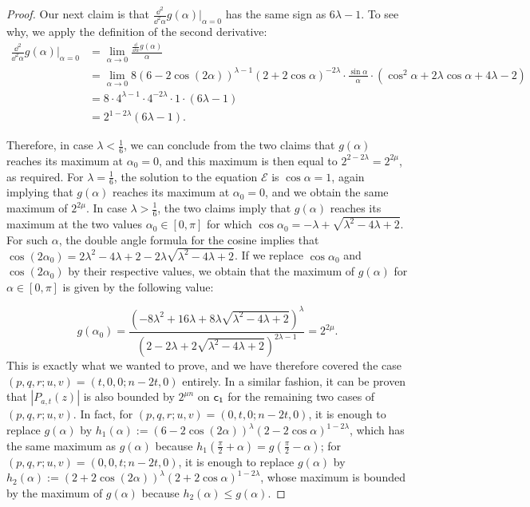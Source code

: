 \documentclass[11pt]{llncs}
\begin{document}
\begin{proof}
    Our next claim is that $\frac{\dd^2}{\dd^2\alpha}g(\alpha)\vert_{\alpha=0}$ has the same sign as $6\lambda -1$. To see why, we apply the definition of the second derivative:
    \begin{align*}
        \frac{\dd^2}{\dd^2\alpha}g(\alpha)\vert_{\alpha=0}
        &=\lim_{\alpha\to 0}\frac{\frac{\dd}{\dd\alpha}g(\alpha)}{\alpha}\\
        &=\lim_{\alpha\to 0}8(6-2\cos(2\alpha))^{\lambda-1}(2+2\cos\alpha)^{-2\lambda}\cdot\frac{\sin\alpha}{\alpha}\cdot\left(\cos^2\alpha+2\lambda\cos\alpha+4\lambda-2\right)\\
        &=8\cdot4^{\lambda-1}\cdot 4^{-2\lambda}\cdot 1\cdot(6\lambda -1)\\
        &=2^{1-2\lambda}(6\lambda -1).
    \end{align*}


    Therefore, in case $\lambda<\frac 16$, we can conclude from the two claims that $g(\alpha)$ reaches its maximum at $\alpha_0=0$, and this maximum is then equal to $2^{2-2\lambda}=2^{2\mu}$, as required. For $\lambda=\frac 16$, the solution to the equation $\mathcal E$ is $\cos\alpha=1$, again implying that $g(\alpha)$ reaches its maximum at $\alpha_0=0$, and we obtain the same maximum of $2^{2\mu}$. In case $\lambda>\frac 16$, the two claims imply that $g(\alpha)$ reaches its maximum at the two values $\alpha_0\in[0,\pi]$ for which $\cos\alpha_0=-\lambda+\sqrt{\lambda^2-4\lambda+2}$. For such $\alpha$, the double angle formula for the cosine implies that $\cos(2\alpha_0)=2\lambda^2-4\lambda+2-2\lambda\sqrt{\lambda^2-4\lambda+2}$. If we replace $\cos\alpha_0$ and $\cos(2\alpha_0)$ by their respective values, we obtain that the maximum of $g(\alpha)$ for $\alpha\in[0,\pi]$ is given by the following value:

    \[
        g(\alpha_0)=\frac{\left(-8\lambda^2+16\lambda+8\lambda\sqrt{\lambda^2-4\lambda+2}\right)^{\lambda}}{\left(2-2\lambda+2\sqrt{\lambda^2-4\lambda+2}\right)^{2\lambda-1}}=2^{2\mu}.
    \]
    This is exactly what we wanted to prove, and we have therefore covered the case $(p,q,r;u,v)=(t,0,0;n-2t,0)$ entirely. In a similar fashion, it can be proven that $|P_{a,t}(z)|$ is also bounded by $2^{\mu n}$ on $\mathsf{c_1}$ for the remaining two cases of $(p,q,r;u,v)$. In fact, for $(p,q,r;u,v)=(0,t,0;n-2t,0)$, it is enough to replace $g(\alpha)$ by $h_1(\alpha):=(6-2\cos(2\alpha))^\lambda(2-2\cos\alpha)^{1-2\lambda}$, which has the same maximum as $g(\alpha)$ because $h_1\left(\frac{\pi}{2}+\alpha\right)=g\left(\frac{\pi}{2}-\alpha\right)$; for $(p,q,r;u,v)=(0,0,t;n-2t,0)$, it is enough to replace $g(\alpha)$ by $h_2(\alpha):=(2+2\cos(2\alpha))^\lambda(2+2\cos\alpha)^{1-2\lambda}$, whose maximum is bounded by the maximum of $g(\alpha)$ because $h_2(\alpha)\leq g(\alpha)$.
\end{proof}
\end{document}
